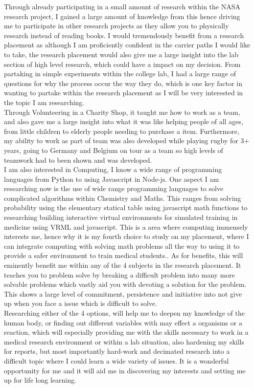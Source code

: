 \documentclass{article}
\begin{document}
Through already participating in a small amount of research within the NASA
research project, I gained a large amount of knowledge from this hence driving
me to participate in other research projects as they allow you to physically
research instead of reading books. I would tremendously benefit from a research
placement as although I am proficiently confident in the carrier paths I would
like to take, the research placement would also give me a large insight into the
lab section of high level research, which could have a impact on my decision.
From partaking in simple experiments within the college lab, I had a large range
of questions for why the process occur the way they do, which is one key factor
in wanting to partake within the research placement as I will be very interested
in the topic I am researching.\\

Through Volunteering in a Charity Shop, it taught me how to work as a team, and
also gave me a large insight into what it was like helping people of all ages,
from little children to elderly people needing to purchase a item. Furthermore,
my ability to work as part of team was also developed while playing rugby for 3+
years, going to Germany and Belgium on tour as a team so high levels of teamwork
had to been shown and was developed.\\

I am also interested in Computing, I know a wide range of programming languages
from Python to using Javascript in Node-js. One aspect I am researching now is
the use of wide range programming languages to solve complicated algorithms
within Chemistry and Maths. This ranges from solving probability using the
elementary statical table using javascript math functions to researching
building interactive virtual environments for simulated training in medicine
using VRML and javascript. This is a area where computing immensely interests
me, hence why it is my fourth choice to study on my placement, where I can
integrate computing with solving math problems all the way to using it to
provide a safer environment to train medical students.. As for benefits, this
will eminently benefit me within any of the 4 subjects in the research
placement. It teaches you to problem solve by breaking a difficult problem into
many more solvable problems which vastly aid you with devoting a solution for
the problem. This shows a large level of commitment, persistence and initiative
into not give up when you face a issue which is difficult to solve.\\

Researching either of the 4 options, will help me to deepen my knowledge of the
human body, or finding out different variables with may effect a organisms or a
reaction, which will especially providing me with the skills necessary to work
in a medical research environment or within a lab situation, also hardening my
skills for reports, but most importantly hard-work and decimated research into a
difficult topic where I could learn a wide variety of issues. It is a wonderful
opportunity for me and it will aid me in discovering my interests and setting me
up for life long learning.
\end{document}
